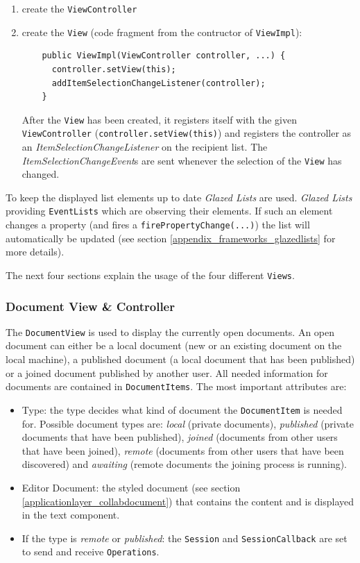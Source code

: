 \begin{enumerate}
\item create the \texttt{View\-Controller}
\item create the \texttt{View} (code fragment from the contructor of \texttt{ViewImpl}):

  \begin{verbatim}
    public ViewImpl(ViewController controller, ...) {
      controller.setView(this);
      addItemSelectionChangeListener(controller);
    }
  \end{verbatim}
  
After the \texttt{View} has been created, it registers itself with the given \texttt{View\-Controller} (\texttt{controller.setView(this)}) and registers the controller as an \emph{Item\-Selection\-Change\-Listener} on the recipient list. The \emph{Item\-Selection\-Change\-Event}s are sent whenever the selection of the \texttt{View} has changed.
\end{enumerate}

To keep the displayed list elements up to date \emph{Glazed Lists} are used. \emph{Glazed Lists} providing \texttt{Event\-Lists} which are observing their elements. If such an element changes a property (and fires a \texttt{firePropertyChange(...)}) the list will automatically be updated (see section \ref{appendix_frameworks_glazedlists} for more details).

The next four sections explain the usage of the four different \texttt{Views}.

\subsubsection{Document View \& Controller}
The \texttt{Document\-View} is used to display the currently open documents. An open document can either be a local document (new or an existing document on the local machine), a published document (a local document that has been published) or a joined document published by another user. All needed information for documents are contained in \texttt{Document\-Items}. The most important attributes are:

\begin{itemize}
\item Type: the type decides what kind of document the \texttt{Document\-Item} is needed for. Possible document types are: \emph{local} (private documents), \emph{published} (private documents that have been published), \emph{joined} (documents from other users that have been joined), \emph{remote} (documents from other users that have been discovered) and \emph{awaiting} (remote documents the joining process is running).
\item Editor Document: the styled document (see section \ref{applicationlayer_collabdocument}) that contains the content and is displayed in the text component.
\item If the type is \emph{remote} or \emph{published}: the \texttt{Session} and \texttt{Session\-Callback} are set to send and receive \texttt{Operations}.
\end{itemize}

